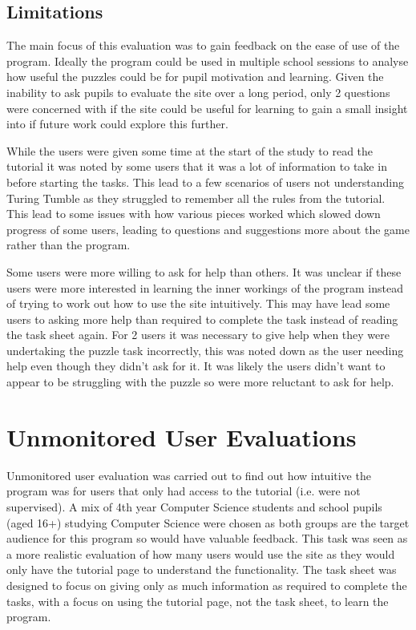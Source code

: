 \documentclass{l4proj}
\begin{document}
\subsection{Limitations}
The main focus of this evaluation was to gain feedback on the ease of use of the program. Ideally the program could be used in multiple school sessions to analyse how useful the puzzles could be for pupil motivation and learning. Given the inability to ask pupils to evaluate the site over a long period, only 2 questions were concerned with if the site could be useful for learning to gain a small insight into if future work could explore this further. 

While the users were given some time at the start of the study to read the tutorial it was noted by some users that it was a lot of information to take in before starting the tasks. This lead to a few scenarios of users not understanding Turing Tumble as they struggled to remember all the rules from the tutorial. This lead to some issues with how various pieces worked which slowed down progress of some users, leading to questions and suggestions more about the game rather than the program. 

Some users were more willing to ask for help than others. It was unclear if these users were more interested in learning the inner workings of the program instead of trying to work out how to use the site intuitively. This may have lead some users to asking more help than required to complete the task instead of reading the task sheet again. For 2 users it was necessary to give help when they were undertaking the puzzle task incorrectly, this was noted down as the user needing help even though they didn't ask for it. It was likely the users didn't want to appear to be struggling with the puzzle so were more reluctant to ask for help.  


\section{Unmonitored User Evaluations}
Unmonitored user evaluation was carried out to find out how intuitive the program was for users that only had access to the tutorial (i.e. were not supervised). A mix of 4th year Computer Science students and school pupils (aged 16+) studying Computer Science were chosen as both groups are the target audience for this program so would have valuable feedback. This task was seen as a more realistic evaluation of how many users would use the site as they would only have the tutorial page to understand the functionality. The task sheet was designed to focus on giving only as much information as required to complete the tasks, with a focus on using the tutorial page, not the task sheet, to learn the program. 
\end{document}
